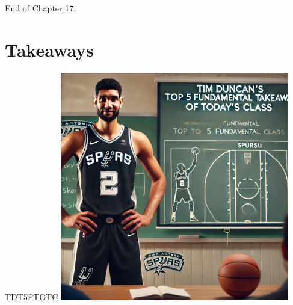 \documentclass{beamer}
\begin{document}
\begin{frame}{}
     \centering
     \Huge End of Chapter 17.
\end{frame}

\section*{Takeaways}

\begin{frame}{TDT5FTOTC}
    \centering
    \includegraphics[width=0.75\textwidth]{figures/tim.png}
\end{frame}
\end{document}
